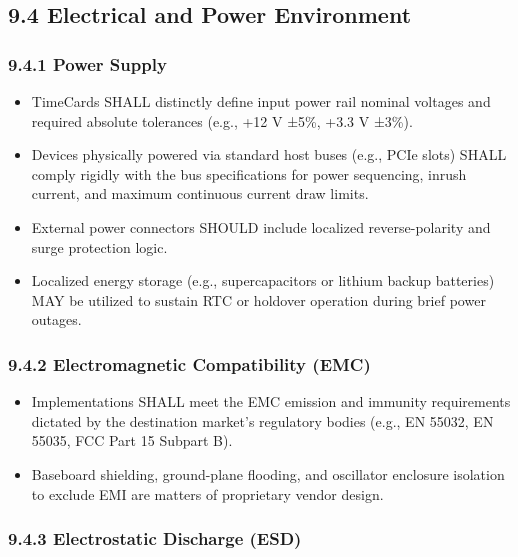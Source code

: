 \documentclass[
]{article}
\begin{document}
\subsection{9.4 Electrical and Power
Environment}\label{electrical-and-power-environment}

\subsubsection{9.4.1 Power Supply}\label{power-supply}

\begin{itemize}
\item
  TimeCards SHALL distinctly define input power rail nominal voltages
  and required absolute tolerances (e.g., +12 V ±5\%, +3.3 V ±3\%).\\
\item
  Devices physically powered via standard host buses (e.g., PCIe slots)
  SHALL comply rigidly with the bus specifications for power sequencing,
  inrush current, and maximum continuous current draw limits.\\
\item
  External power connectors SHOULD include localized reverse-polarity
  and surge protection logic.\\
\item
  Localized energy storage (e.g., supercapacitors or lithium backup
  batteries) MAY be utilized to sustain RTC or holdover operation during
  brief power outages.
\end{itemize}

\subsubsection{9.4.2 Electromagnetic Compatibility
(EMC)}\label{electromagnetic-compatibility-emc}

\begin{itemize}
\item
  Implementations SHALL meet the EMC emission and immunity requirements
  dictated by the destination market's regulatory bodies (e.g., EN
  55032, EN 55035, FCC Part 15 Subpart B).\\
\item
  Baseboard shielding, ground-plane flooding, and oscillator enclosure
  isolation to exclude EMI are matters of proprietary vendor design.
\end{itemize}

\subsubsection{9.4.3 Electrostatic Discharge
(ESD)}\label{electrostatic-discharge-esd}
\end{document}
